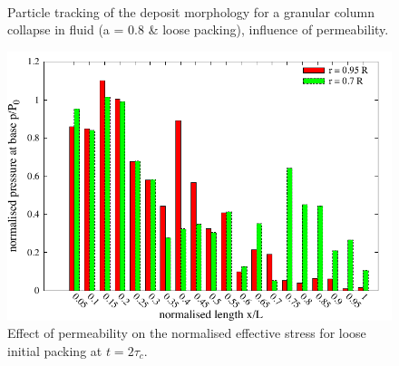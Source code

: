 \documentclass[12pt,a4paper,twocolumn,fleqn]{narms}
\begin{document}
\begin{figure}
\centering
{}\\
\caption{Particle tracking of the deposit morphology
for a granular column collapse in fluid (a = 0.8 \& loose packing), influence 
of permeability.}
\label{fig:Loose_a08_permeability}
\end{figure}

\begin{figure}
\centering
\includegraphics[width=0.97\columnwidth]{figs/a08/effective_stress_a08}
\caption{Effect of permeability on the normalised effective stress for loose 
initial packing at $t = 2\tau_c$.}
\label{fig:effective_stress_a08}
\end{figure}
\end{document}
